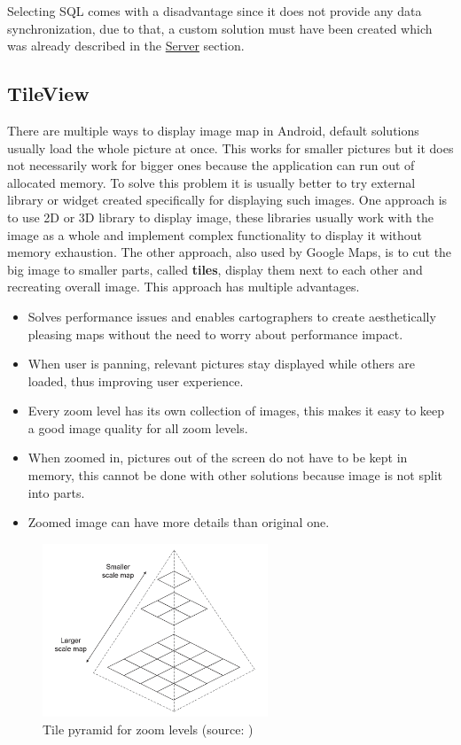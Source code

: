 Selecting SQL comes with a disadvantage since it does not provide any data synchronization, due to that, a custom solution must have been created which was already described in the \hyperref[sec:Server]{Server} section.

\subsection{TileView}\label{subsec:TileView}
There are multiple ways to display image map in Android, default solutions usually load the whole picture at once. This works for smaller pictures but it does not necessarily work for bigger ones because the application can run out of allocated memory. To solve this problem it is usually better to try external library or widget created specifically for displaying such images. One approach is to use 2D or 3D library to display image, these libraries usually work with the image as a whole and implement complex functionality to display it without memory exhaustion. The other approach, also used by Google Maps, is to cut the big image to smaller parts, called \textbf{tiles}, display them next to each other and recreating overall image. This approach has multiple advantages.

\begin{itemize}
	\item Solves performance issues and enables cartographers to create aesthetically pleasing maps without the need to worry about performance impact.
	\item When user is panning, relevant pictures stay displayed while others are loaded, thus improving user experience.
	\item Every zoom level has its own collection of images, this makes it easy to keep a good image quality for all zoom levels.
	\item When zoomed in, pictures out of the screen do not have to be kept in memory, this cannot be done with other solutions because image is not split into parts.
	\item Zoomed image can have more details than original one.
\end{itemize}

\begin{figure}[H]
	\begin{centering}
		\includegraphics[width=0.6\textwidth]{img/tile_pyramid}
		\par\end{centering}
	\caption{Tile pyramid for zoom levels (source: \cite{WTM})\label{fig:TilePyramid}}
	\label{fig03c05}
\end{figure}


